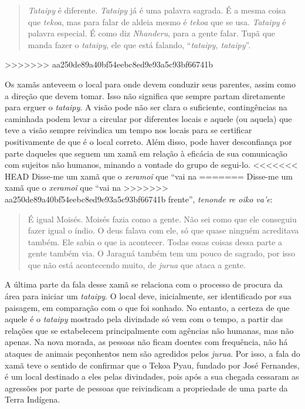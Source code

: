 \begin{quote}
\emph{Tataipy} é diferente. \emph{Tataipy} já é uma palavra sagrada. É a mesma coisa
que \emph{tekoa}, mas para falar de aldeia mesmo é \emph{tekoa} que se usa. \emph{Tataipy} é
palavra especial. É como diz \emph{Nhanderu}, para a gente falar. Tupã que
manda fazer o \emph{tataipy}, ele que está falando, ``\emph{tataipy, tataipy}''.
\end{quote}
>>>>>>> aa250de89a40bf54eebc8ed9e93a5c93bf66741b

Os xamãs anteveem o local para onde devem conduzir seus parentes, assim
como a direção que devem tomar. Isso não significa que sempre partam
diretamente para erguer o \emph{tataipy}. A visão pode não ser clara o
suficiente, contingências na caminhada podem levar a circular por
diferentes locais e aquele (ou aquela) que teve a visão sempre
reivindica um tempo nos locais para se certificar positivamente de que
é o local correto. Além disso, pode haver desconfiança por parte
daqueles que seguem um xamã em relação à eficácia de sua comunicação
com sujeitos não humanos, minando a vontade do grupo de segui-lo.
<<<<<<< HEAD
Disse-me um xamã que o \emph{xeramoĩ} que ``vai na
=======
Disse-me um xamã que o \emph{xeramo\~{i}} que ``vai na
>>>>>>> aa250de89a40bf54eebc8ed9e93a5c93bf66741b
frente'', \emph{tenonde re oiko va’e}:

\begin{quote}
É igual Moisés. Moisés fazia como a gente. Não sei como que ele
conseguiu fazer igual o índio. O deus falava com ele, só que quase
ninguém acreditava também. Ele sabia o que ia acontecer. Todas essas
coisas dessa parte a gente também via. O Jaraguá também tem um pouco de
sagrado, por isso que não está acontecendo muito, de \emph{jurua} que
ataca a gente.
\end{quote}

A última parte da fala desse xamã se relaciona com o processo de procura
da área para iniciar um \emph{tataipy}. O local deve, inicialmente, ser
identificado por sua paisagem, em comparação com o que foi sonhado. No
entanto, a certeza de que aquele é o \emph{tataipy} mostrado pela
divindade só vem com o tempo, a partir das relações que se estabelecem
principalmente com agências não humanas, mas não apenas. Na nova morada,
as pessoas não ficam doentes com frequência, não há ataques de animais
peçonhentos nem são agredidos pelos \emph{jurua}. Por isso, a fala do
xamã teve o sentido de confirmar que o Tekoa Pyau, fundado por José
Fernandes, é um local destinado a eles pelas divindades, pois após a
sua chegada cessaram as agressões por parte de pessoas que reivindicam
a propriedade de uma parte da Terra Indígena.

